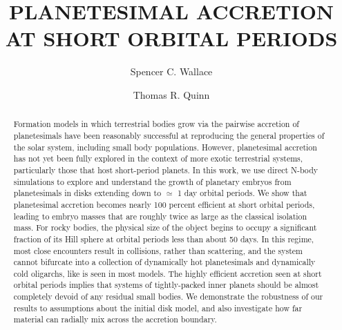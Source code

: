 \documentclass[onecolumn]{aastex63}
\begin{document}
\title{PLANETESIMAL ACCRETION AT SHORT ORBITAL PERIODS}

\author{Spencer C. Wallace}

\author{Thomas R. Quinn}

\begin{abstract}
Formation models in which terrestrial bodies grow via the pairwise accretion of planetesimals have been reasonably successful at reproducing the general properties of the solar system, including small body populations. However, planetesimal accretion has not yet been fully explored in the context of more exotic terrestrial systems, particularly those that host short-period planets. In this work, we use direct N-body simulations to explore and understand the growth of planetary embryos from planetesimals in disks extending down to $\simeq$ 1 day orbital periods. We show that planetesimal accretion becomes nearly 100 percent efficient at short orbital periods, leading to embryo masses that are roughly twice as large as the classical isolation mass. For rocky bodies, the physical size of the object begins to occupy a significant fraction of its Hill sphere at orbital periods less than about 50 days. In this regime, most close encounters result in collisions, rather than scattering, and the system cannot bifurcate into a collection of dynamically hot planetesimals and dynamically cold oligarchs, like is seen in most models. The highly efficient accretion seen at short orbital periods implies that systems of tightly-packed inner planets should be almost completely devoid of any residual small bodies. We demonstrate the robustness of our results to assumptions about the initial disk model, and also investigate how far material can radially mix across the accretion boundary.
\end{abstract}
\end{document}
